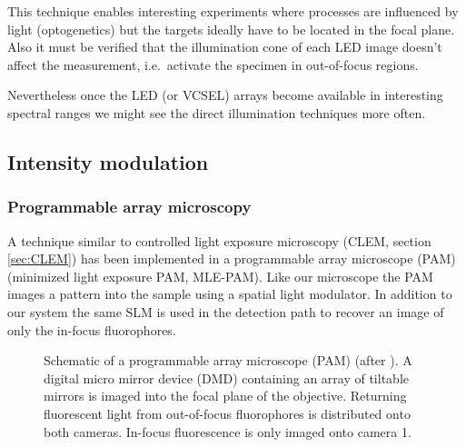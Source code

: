
This technique enables interesting experiments where processes are
influenced by light (optogenetics) but the targets ideally have to be
located in the focal plane. Also it must be verified that the
illumination cone of each LED image doesn't affect the measurement,
i.e.\ activate the specimen in out-of-focus regions.

Nevertheless once the LED (or VCSEL) arrays become available in
interesting spectral ranges we might see the direct illumination
techniques more often.

\subsection{Intensity modulation}
\subsubsection{Programmable array microscopy}
A technique similar to controlled light exposure microscopy (CLEM,
section \ref{sec:CLEM}) has been implemented in a programmable array
microscope (PAM) \citep{Caarls2011} (minimized light exposure PAM,
MLE-PAM). Like our microscope the PAM images a pattern into the sample
using a spatial light modulator. In addition to our system the same
SLM is used in the detection path to recover an image of only the
in-focus fluorophores.

\begin{figure}[!hbt]
  \centering
  
  \caption{Schematic of a programmable array microscope (PAM) (after
    \cite{Verveer1998}). A digital micro mirror device (DMD) containing
    an array of tiltable mirrors is imaged into the focal plane of the
    objective. Returning fluorescent light from out-of-focus
    fluorophores is distributed onto both cameras. In-focus
    fluorescence is only imaged onto camera 1.}
  \label{fig:pam-sketch}
\end{figure}


%
%
%

